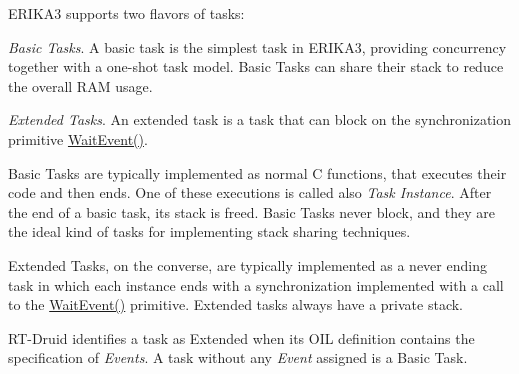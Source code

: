 E\+R\+I\+K\+A3 supports two flavors of tasks\+:
\begin{DoxyItemize}
\item {\itshape Basic Tasks}. A basic task is the simplest task in E\+R\+I\+K\+A3, providing concurrency together with a one-\/shot task model. Basic Tasks can share their stack to reduce the overall R\+AM usage.
\item {\itshape Extended Tasks}. An extended task is a task that can block on the synchronization primitive \mbox{\hyperlink{group__primitives-event_gaefbe4d95d1e197c7bbecdb12dab07097}{Wait\+Event()}}.
\end{DoxyItemize}

Basic Tasks are typically implemented as normal C functions, that executes their code and then ends. One of these executions is called also {\itshape Task Instance}. After the end of a basic task, its stack is freed. Basic Tasks never block, and they are the ideal kind of tasks for implementing stack sharing techniques.

Extended Tasks, on the converse, are typically implemented as a never ending task in which each instance ends with a synchronization implemented with a call to the \mbox{\hyperlink{group__primitives-event_gaefbe4d95d1e197c7bbecdb12dab07097}{Wait\+Event()}} primitive. Extended tasks always have a private stack.

R\+T-\/\+Druid identifies a task as Extended when its O\+IL definition contains the specification of {\itshape Events}. A task without any {\itshape Event} assigned is a Basic Task.

